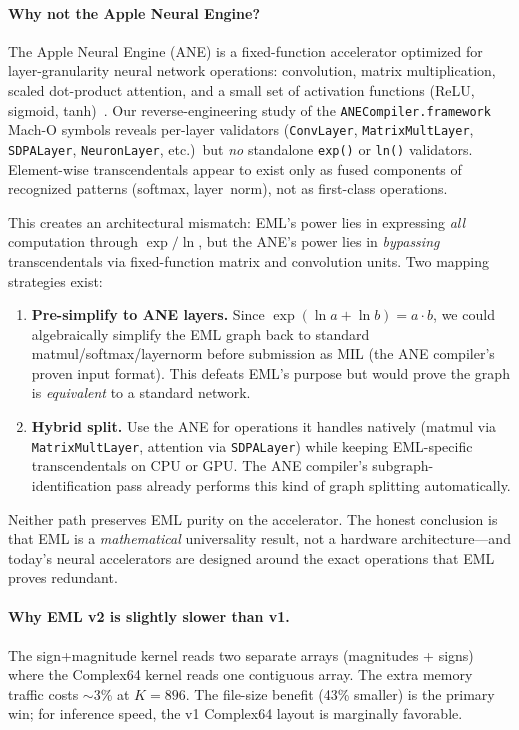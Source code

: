 \documentclass[acmsmall,nonacm]{acmart}
\begin{document}
\paragraph{Why not the Apple Neural Engine?}
The Apple Neural Engine (ANE) is a fixed-function accelerator optimized
for layer-granularity neural network operations: convolution, matrix
multiplication, scaled dot-product attention, and a small set of
activation functions (ReLU, sigmoid, tanh)~\cite{kumaresan2026}.  Our
reverse-engineering study of the \texttt{ANECompiler.framework} Mach-O
symbols reveals per-layer validators (\texttt{ConvLayer},
\texttt{MatrixMultLayer}, \texttt{SDPALayer}, \texttt{NeuronLayer},
etc.)~but \emph{no} standalone \texttt{exp()} or \texttt{ln()}
validators.  Element-wise transcendentals appear to exist only as fused
components of recognized patterns (softmax, layer~norm), not as
first-class operations.

This creates an architectural mismatch: EML's power lies in expressing
\emph{all} computation through $\exp/\ln$, but the ANE's power lies in
\emph{bypassing} transcendentals via fixed-function matrix and
convolution units.  Two mapping strategies exist:
\begin{enumerate}
\item \textbf{Pre-simplify to ANE layers.}  Since
  $\exp(\ln a + \ln b) = a \cdot b$, we could algebraically simplify
  the EML graph back to standard matmul/softmax/layernorm before
  submission as MIL (the ANE compiler's proven input format).  This
  defeats EML's purpose but would prove the graph is \emph{equivalent}
  to a standard network.
\item \textbf{Hybrid split.}  Use the ANE for operations it handles
  natively (matmul via \texttt{MatrixMultLayer}, attention via
  \texttt{SDPALayer}) while keeping EML-specific transcendentals on
  CPU or GPU.  The ANE compiler's subgraph-identification pass
  already performs this kind of graph splitting automatically.
\end{enumerate}
Neither path preserves EML purity on the accelerator.  The honest
conclusion is that EML is a \emph{mathematical} universality result,
not a hardware architecture---and today's neural accelerators are
designed around the exact operations that EML proves redundant.

\paragraph{Why EML v2 is slightly slower than v1.}
The sign+magnitude kernel reads two separate arrays (magnitudes + signs)
where the Complex64 kernel reads one contiguous array.  The extra memory
traffic costs $\sim$3\% at $K{=}896$.  The file-size benefit (43\%
smaller) is the primary win; for inference speed, the v1 Complex64
layout is marginally favorable.
\end{document}
